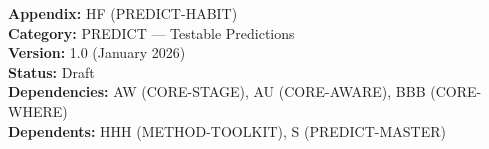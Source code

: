 %
%
%
%

%
%
%
%
%

\begin{tcolorbox}[colback=gray!5!white, colframe=gray!75!black,
    title=Appendix Metadata]
\textbf{Appendix:} HF (PREDICT-HABIT) \\
\textbf{Category:} PREDICT --- Testable Predictions \\
\textbf{Version:} 1.0 (January 2026) \\
\textbf{Status:} Draft \\
\textbf{Dependencies:} AW (CORE-STAGE), AU (CORE-AWARE), BBB (CORE-WHERE) \\
\textbf{Dependents:} HHH (METHOD-TOOLKIT), S (PREDICT-MASTER)
\end{tcolorbox}

